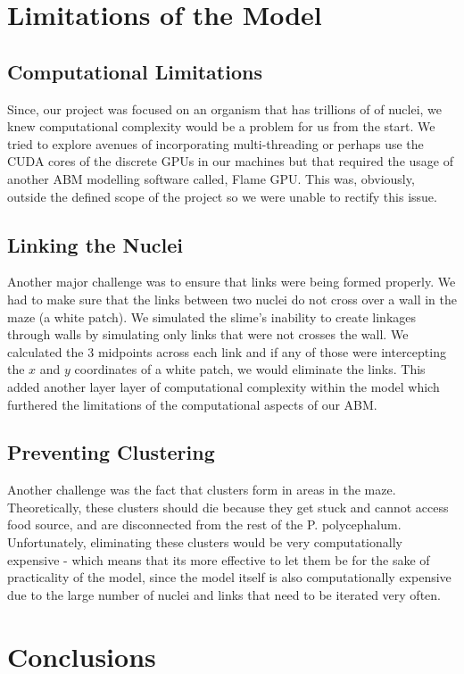 \documentclass[a4paper, 11pt]{article}
\begin{document}
\section{Limitations of the Model}
\subsection{Computational Limitations}
Since, our project was focused on an organism that has trillions of of nuclei, we knew computational complexity would be a problem for us from the start. We tried to explore avenues of incorporating multi-threading or perhaps use the CUDA cores of the discrete GPUs in our machines but that required the usage of another ABM modelling software called, Flame GPU. This was, obviously, outside the defined scope of the project so we were unable to rectify this issue.
\subsection{Linking the Nuclei}
Another major challenge was to ensure that links were being formed properly. We had to make sure that the links between two nuclei do not cross over a wall in the maze (a white patch). We simulated the slime's inability to create linkages through walls by simulating only links that were not crosses the wall. We calculated the 3 midpoints across each link and if any of those were intercepting the $x$ and $y$ coordinates of a white patch, we would eliminate the links. This added another layer layer of computational complexity within the model which furthered the limitations of the computational aspects of our ABM. 
\subsection{Preventing Clustering}
Another challenge was the fact that clusters form in areas in the maze. Theoretically, these clusters should die because they get stuck and cannot access food source, and are disconnected from the rest of the P. polycephalum. Unfortunately, eliminating these clusters would be very computationally expensive - which means that its more effective to let them be for the sake of practicality of the model, since the model itself is also computationally expensive due to the large number of nuclei and links that need to be iterated very often.  
\section{Conclusions}
\newpage
\end{document}
